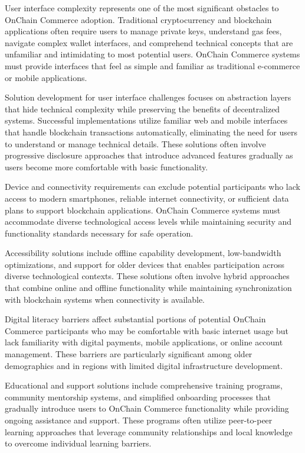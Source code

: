 \documentclass[
  Letterpaper,
]{scrbook}
\begin{document}
User interface complexity represents one of the most significant
obstacles to OnChain Commerce adoption. Traditional cryptocurrency and
blockchain applications often require users to manage private keys,
understand gas fees, navigate complex wallet interfaces, and comprehend
technical concepts that are unfamiliar and intimidating to most
potential users. OnChain Commerce systems must provide interfaces that
feel as simple and familiar as traditional e-commerce or mobile
applications.

Solution development for user interface challenges focuses on
abstraction layers that hide technical complexity while preserving the
benefits of decentralized systems. Successful implementations utilize
familiar web and mobile interfaces that handle blockchain transactions
automatically, eliminating the need for users to understand or manage
technical details. These solutions often involve progressive disclosure
approaches that introduce advanced features gradually as users become
more comfortable with basic functionality.

Device and connectivity requirements can exclude potential participants
who lack access to modern smartphones, reliable internet connectivity,
or sufficient data plans to support blockchain applications. OnChain
Commerce systems must accommodate diverse technological access levels
while maintaining security and functionality standards necessary for
safe operation.

Accessibility solutions include offline capability development,
low-bandwidth optimizations, and support for older devices that enables
participation across diverse technological contexts. These solutions
often involve hybrid approaches that combine online and offline
functionality while maintaining synchronization with blockchain systems
when connectivity is available.

Digital literacy barriers affect substantial portions of potential
OnChain Commerce participants who may be comfortable with basic internet
usage but lack familiarity with digital payments, mobile applications,
or online account management. These barriers are particularly
significant among older demographics and in regions with limited digital
infrastructure development.

Educational and support solutions include comprehensive training
programs, community mentorship systems, and simplified onboarding
processes that gradually introduce users to OnChain Commerce
functionality while providing ongoing assistance and support. These
programs often utilize peer-to-peer learning approaches that leverage
community relationships and local knowledge to overcome individual
learning barriers.
\end{document}
